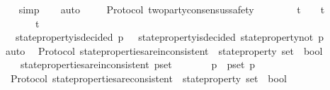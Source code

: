 \begin{isabellebody}
%
\isadelimproof
\ \ %
\endisadelimproof
%
\isatagproof
{}\isamarkupfalse%
\ simp\isanewline
\ \ \isamarkupfalse%
\ auto%
\endisatagproof
{\isafoldproof}%
%
\isadelimproof
\isanewline
%
\endisadelimproof
\ \ \isanewline
\isanewline
{}\isamarkupfalse%
\ {\isacharparenleft}\ Protocol{\isacharparenright}\ two{\isacharunderscore}party{\isacharunderscore}consensus{\isacharunderscore}safety\ {\isacharcolon}\isanewline
\ \ {\isachardoublequoteopen}{\isasymforall}\ {\isasymsigma}{}\ {\isasymsigma}{}{\isachardot}\ {\isasymsigma}{}\ {\isasymin}\ {\isasymSigma}t\ {\isasymand}\ {\isasymsigma}{}\ {\isasymin}\ {\isasymSigma}t\isanewline
\ \ {\isasymlongrightarrow}\ {\isacharparenleft}{\isasymsigma}{}\ {\isasymunion}\ {\isasymsigma}{}{\isacharparenright}\ {\isasymin}\ {\isasymSigma}t\isanewline
\ \ {\isasymlongrightarrow}\ {\isasymnot}{\isacharparenleft}state{\isacharunderscore}property{\isacharunderscore}is{\isacharunderscore}decided\ {\isacharparenleft}p{\isacharcomma}\ {\isasymsigma}{}{\isacharparenright}\ {\isasymand}\ state{\isacharunderscore}property{\isacharunderscore}is{\isacharunderscore}decided\ {\isacharparenleft}state{\isacharunderscore}property{\isacharunderscore}not\ p{\isacharcomma}\ {\isasymsigma}{}{\isacharparenright}{\isacharparenright}{\isachardoublequoteclose}\isanewline
%
\isadelimproof
\ \ %
\endisadelimproof
%
\isatagproof
{}\isamarkupfalse%
\ auto%
\endisatagproof
{\isafoldproof}%
%
\isadelimproof
\isanewline
%
\endisadelimproof
\isanewline
\isanewline
{}\isamarkupfalse%
\ {\isacharparenleft}\ Protocol{\isacharparenright}\ state{\isacharunderscore}properties{\isacharunderscore}are{\isacharunderscore}inconsistent\ {\isacharcolon}{\isacharcolon}\ {\isachardoublequoteopen}state{\isacharunderscore}property\ set\ {\isasymRightarrow}\ bool{\isachardoublequoteclose}\isanewline
\ \ \isanewline
\ \ \ \ {\isachardoublequoteopen}state{\isacharunderscore}properties{\isacharunderscore}are{\isacharunderscore}inconsistent\ p{\isacharunderscore}set\ {\isacharequal}\ {\isacharparenleft}{\isasymforall}\ {\isasymsigma}\ {\isasymin}\ {\isasymSigma}{\isachardot}\ {\isasymnot}\ {\isacharparenleft}{\isasymforall}\ p\ {\isasymin}\ p{\isacharunderscore}set{\isachardot}\ p\ {\isasymsigma}{\isacharparenright}{\isacharparenright}{\isachardoublequoteclose}\isanewline
\isanewline
\isanewline
{}\isamarkupfalse%
\ {\isacharparenleft}\ Protocol{\isacharparenright}\ state{\isacharunderscore}properties{\isacharunderscore}are{\isacharunderscore}consistent\ {\isacharcolon}{\isacharcolon}\ {\isachardoublequoteopen}state{\isacharunderscore}property\ set\ {\isasymRightarrow}\ bool{\isachardoublequoteclose}\isanewline

\end{isabellebody}
